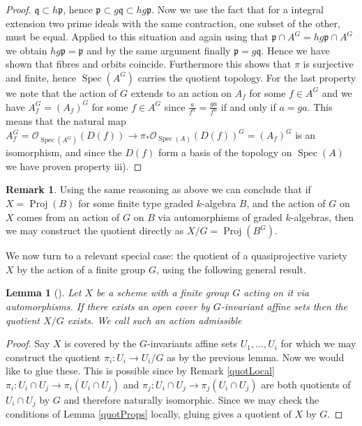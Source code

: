 \documentclass[11pt, a4paper, german, twoside]{article}
\theoremstyle{plain}
\newtheorem{lemma}[theorem]{Lemma}
\theoremstyle{definition}
\newtheorem{remark}[theorem]{Remark}
\DeclareMathOperator{\Spec}{Spec}
\DeclareMathOperator{\Proj}{Proj}
\begin{document}
\begin{proof}
    $\mathfrak{q} \subset h\mathfrak{p}$, hence $\mathfrak{p} \subset g\mathfrak{q} \subset hg\mathfrak{p}$. Now we use the fact that
    for a integral extension two prime ideals with the same contraction, one subset of the other, must be equal. Applied to this
    situation and again using that $\mathfrak{p} \cap A^G = hg\mathfrak{p} \cap A^G$ we obtain $hg\mathfrak{p} = \mathfrak{p}$ and by the same
    argument finally $\mathfrak{p} = g\mathfrak{q}$. Hence we have shown that fibres and orbits coincide. Furthermore this shows that $\pi$ is
    surjective and finite, hence $\Spec(A^G)$ carries the quotient topology.
    For the last property we note that the action of $G$ extends to an action on $A_f$ for some $f \in A^G$ and we have 
    $A^G_f = (A_f)^G$ for some $f \in A^G$ since $\frac{a}{f^n} = \frac{ga}{f^n}$ if and only if $a = ga$. This means that the natural
    map $A^G_f = \mathcal{O}_{\Spec(A^G)}(D(f)) \to \pi_*\mathcal{O}_{\Spec(A)}(D(f))^G = (A_f)^G$ is an isomorphism, and since the $D(f)$ form
    a basis of the topology on $\Spec(A)$ we have proven property iii).
\end{proof}

\begin{remark}
    Using the same reasoning as above we can conclude that if $X = \Proj(B)$ for some finite type graded $k$-algebra $B$, 
    and the action of $G$ on $X$ comes from
    an action of $G$ on $B$ via automorphisms of graded $k$-algebras, then we may construct the quotient directly as $X/G = \Proj(B^G)$.
\end{remark}

We now turn to a relevant special case: the quotient of a quasiprojective variety $X$ by the action of a finite group $G$, using the following
general result.

\begin{lemma}[{\cite[Prop. 1.8]{SGA1}}]    
    Let $X$ be a scheme with a finite group $G$ acting on it via automorphisms. If there exists an open cover by $G$-invariant affine sets
    then the quotient $X/G$ exists.
    We call such an action \emph{admissible}
\end{lemma}
\begin{proof}
    Say $X$ is covered by the $G$-invariants affine sets $U_1,\dots,U_i$ for which we may construct the quotient $\pi_i \colon U_i \to U_i/G$ 
    as by the previous lemma. Now we would like to glue these. This is possible since by Remark \ref{quotLocal} 
$\pi_i \colon U_i \cap U_j \to \pi_i(U_i \cap U_j)$ and $\pi_j \colon U_i \cap U_j \to \pi_j(U_i \cap U_j)$ are both quotients of $U_i \cap U_j$
    by $G$ and therefore naturally isomorphic. Since we may check the conditions of Lemma \ref{quotProps} locally, gluing gives a quotient of 
    $X$ by $G$.
\end{proof}
\end{document}
